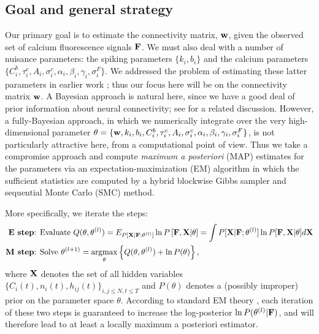 \subsection{Goal and general strategy}  \label{sec:methods:goal}

Our primary goal is to estimate the connectivity matrix, $\mathbf{w}$, given
the observed set of calcium fluorescence signals ${\bf F}$. We must
also deal with a number of nuisance parameters: the spiking parameters
$\{k_i, b_i\}$ and the calcium parameters $\{C^b_i, \tau^c_i, A_i,
\sigma^c_i, \alpha_i, \beta_i, \gamma_i, \sigma^F_i\}$. We addressed
the problem of estimating these latter parameters in earlier work
\cite{Vogelstein2009}; thus our focus here will be on the connectivity
matrix $\mathbf{w}$. A Bayesian approach is natural here, since we have a
good deal of prior information about neural connectivity; see
\cite{Rigat06} for a related discussion. However, a fully-Bayesian
approach, in which we numerically integrate over the very
high-dimensional parameter $\theta = \{\mathbf{w}, k_i, b_i, C^b_i, \tau^c_i,
A_i, \sigma^c_i, \alpha_i, \beta_i, \gamma_i, \sigma^F_i\}$, is not
particularly attractive here, from a computational point of view. Thus
we take a compromise approach and compute \emph{maximum a posteriori}
(MAP) estimates for the parameters via an expectation-maximization
(EM) algorithm in which the sufficient statistics are computed by a
hybrid blockwise Gibbs sampler and sequential Monte Carlo (SMC)
method.

More specifically, we iterate the steps:
\begin{align*}
\textbf{E step} &\text{: Evaluate } Q(\bth,\bth^{(l)}) = E_{P[\bX |
\bF; \bth^{(l)}]} \ln P \left[ \bF, \bX | \bth \right] = \int P[\bX |
\bF; \bth^{(l)}] \ln P[\bF, \bX | \bth] d \bX \\ \textbf{M step}
&\text{: Solve } \bth^{(l+1)} = \argmax_{\bth} \left\{
Q(\bth,\bth^{(l)}) + \ln P(\theta) \right\},
\end{align*}
where ${\bf X}$ denotes the set of all hidden variables $\{ C_i(t),
n_i(t), h_{ij}(t) \}_{i,j \leq N, t \leq T}$ and $P(\theta)$ denotes a
(possibly improper) prior on the parameter space $\theta$. According
to standard EM theory \cite{DLR77,McLachlanKrishnan96}, each iteration
of these two steps is guaranteed to increase the log-posterior $\ln
P(\mathbf{\theta}^{(l)} | {\bf F})$, and will therefore lead to at least a locally
maximum a posteriori estimator.

